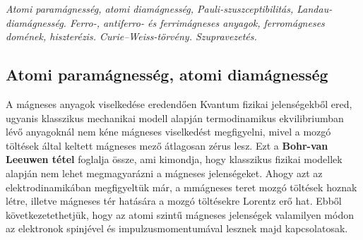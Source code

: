 \documentclass[../main.tex]{subfiles}
\begin{document}
\textit{
    Atomi paramágnesség, atomi diamágnesség, Pauli-szuszceptibilitás, Landau-diamágnesség.
    Ferro-, antiferro- és ferrimágneses anyagok, ferromágneses domének, hiszterézis. Curie–Weiss-törvény. Szupravezetés.
}

\subsection{Atomi paramágnesség, atomi diamágnesség}
A mágneses anyagok viselkedése eredendően Kvantum fizikai jelenségekből ered, ugyanis klasszikus mechanikai modell alapján termodinamikus ekvilibriumban lévő anyagoknál nem kéne mágneses viselkedést megfigyelni,
mivel a mozgó töltések által keltett mágneses mező átlagosan zérus lesz. Ezt a \textbf{Bohr-van Leeuwen tétel} foglalja össze, ami kimondja, hogy klasszikus fizikai modellek alapján nem lehet megmagyarázni a mágneses jelenségeket.
Ahogy azt az elektrodinamikában megfigyeltük már, a mmágneses teret mozgó töltések hoznak létre, illetve mágneses tér hatására a mozgó töltésekre Lorentz erő hat.
Ebből következetethetjük, hogy az atomi szintű mágneses jelenségek valamilyen módon az elektronok spinjével és impulzusmomentumával lesznek majd kapcsolatosak.
\end{document}
